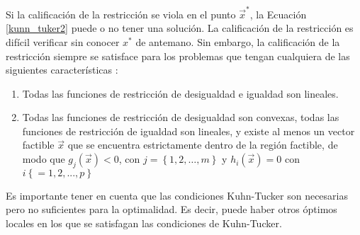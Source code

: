 Si la calificación de la restricción se viola en el punto $\vec{x}^*$, la Ecuación \ref{kunn_tuker2} puede o no tener una solución. La calificación de la restricción es difícil verificar sin conocer $\textit{x}^*$ de antemano. Sin embargo, la calificación de la restricción siempre se satisface para los problemas que tengan cualquiera de las siguientes características \cite{rao_engineering_2009}:
\begin{enumerate}
\item Todas las funciones de restricción de desigualdad e igualdad son lineales. 
\item Todas las funciones de restricción de desigualdad son convexas, todas las funciones de restricción de igualdad son lineales, y existe al menos un vector factible $\vec{x}$ que se encuentra estrictamente dentro de la región factible, de modo que $g_j(\vec{x}) < 0$, con $j =\left\lbrace  1,2,\ldots,m \right\rbrace $ y $ h_i(\vec{x}) = 0$ con $i \left\lbrace = 1,2,...,p\right\rbrace $
\end{enumerate}
Es importante tener en cuenta que las condiciones Kuhn-Tucker  son necesarias pero no suficientes para la optimalidad. Es decir, puede haber otros óptimos locales en los que se satisfagan las condiciones de Kuhn-Tucker. 


